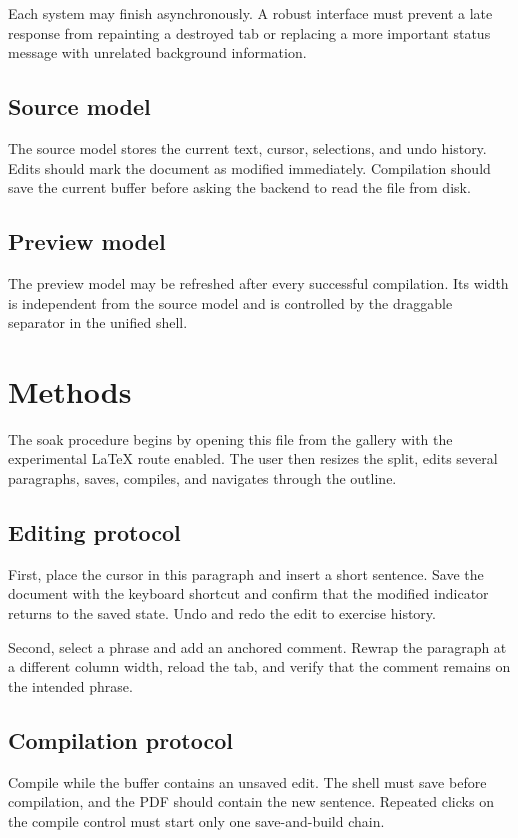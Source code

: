 \documentclass[11pt]{article}
\begin{document}
Each system may finish asynchronously. A robust interface must prevent a late
response from repainting a destroyed tab or replacing a more important status
message with unrelated background information.

\subsection{Source model}
The source model stores the current text, cursor, selections, and undo history.
Edits should mark the document as modified immediately. Compilation should save
the current buffer before asking the backend to read the file from disk.

\subsection{Preview model}
The preview model may be refreshed after every successful compilation. Its
width is independent from the source model and is controlled by the draggable
separator in the unified shell.

\section{Methods}
The soak procedure begins by opening this file from the gallery with the
experimental LaTeX route enabled. The user then resizes the split, edits several
paragraphs, saves, compiles, and navigates through the outline.

\subsection{Editing protocol}
First, place the cursor in this paragraph and insert a short sentence. Save the
document with the keyboard shortcut and confirm that the modified indicator
returns to the saved state. Undo and redo the edit to exercise history.

Second, select a phrase and add an anchored comment. Rewrap the paragraph at a
different column width, reload the tab, and verify that the comment remains on
the intended phrase.

\subsection{Compilation protocol}
Compile while the buffer contains an unsaved edit. The shell must save before
compilation, and the PDF should contain the new sentence. Repeated clicks on the
compile control must start only one save-and-build chain.
\end{document}
